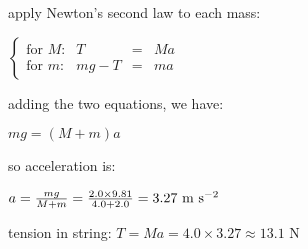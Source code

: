\sol apply Newton's second law to each mass:

{
	\centering
	
	$\left\{ \begin{array}{lcll} \text{for $M$:} & T &=& Ma \\ \text{for $m$:} & mg-T &=& ma \end{array} \right.$
	
}

\vspace{0.4em} adding the two equations, we have:

{
	\centering
	
	$ mg = (M+m) a $
	
}

so acceleration is:

{
	\centering
	
	$a = \frac{mg}{M+m} = \frac{2.0\times9.81}{4.0+2.0} = 3.27 \text{ m s$^{-2}$}$
	
}

tension in string: $T = Ma = 4.0 \times 3.27 \approx 13.1 \text{ N}$ \eoe



